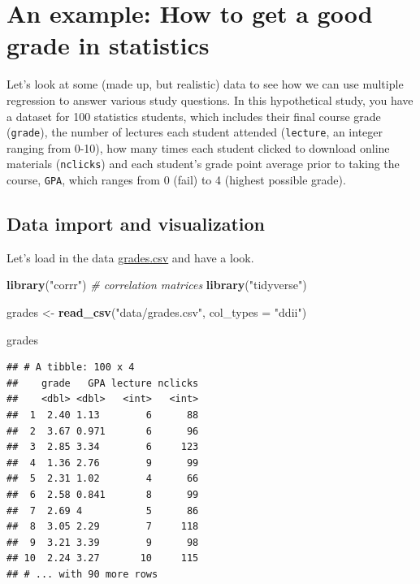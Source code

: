 \documentclass[]{book}
\newenvironment{Shaded}{\begin{snugshade}}{\end{snugshade}}
\newcommand{\CommentTok}[1]{\textcolor[rgb]{0.56,0.35,0.01}{\textit{#1}}}
\newcommand{\DataTypeTok}[1]{\textcolor[rgb]{0.13,0.29,0.53}{#1}}
\newcommand{\KeywordTok}[1]{\textcolor[rgb]{0.13,0.29,0.53}{\textbf{#1}}}
\newcommand{\NormalTok}[1]{#1}
\newcommand{\StringTok}[1]{\textcolor[rgb]{0.31,0.60,0.02}{#1}}
\begin{document}
\hypertarget{an-example-how-to-get-a-good-grade-in-statistics}{%
\section{An example: How to get a good grade in statistics}\label{an-example-how-to-get-a-good-grade-in-statistics}}

Let's look at some (made up, but realistic) data to see how we can use multiple regression to answer various study questions. In this hypothetical study, you have a dataset for 100 statistics students, which includes their final course grade (\texttt{grade}), the number of lectures each student attended (\texttt{lecture}, an integer ranging from 0-10), how many times each student clicked to download online materials (\texttt{nclicks}) and each student's grade point average prior to taking the course, \texttt{GPA}, which ranges from 0 (fail) to 4 (highest possible grade).

\hypertarget{data-import-and-visualization}{%
\subsection{Data import and visualization}\label{data-import-and-visualization}}

Let's load in the data \href{data/grades.csv}{grades.csv} and have a look.

\begin{Shaded}
\begin{Highlighting}[]
\KeywordTok{library}\NormalTok{(}\StringTok{"corrr"}\NormalTok{) }\CommentTok{# correlation matrices}
\KeywordTok{library}\NormalTok{(}\StringTok{"tidyverse"}\NormalTok{)}

\NormalTok{grades <-}\StringTok{ }\KeywordTok{read_csv}\NormalTok{(}\StringTok{"data/grades.csv"}\NormalTok{, }\DataTypeTok{col_types =} \StringTok{"ddii"}\NormalTok{)}

\NormalTok{grades}
\end{Highlighting}
\end{Shaded}

\begin{verbatim}
## # A tibble: 100 x 4
##    grade   GPA lecture nclicks
##    <dbl> <dbl>   <int>   <int>
##  1  2.40 1.13        6      88
##  2  3.67 0.971       6      96
##  3  2.85 3.34        6     123
##  4  1.36 2.76        9      99
##  5  2.31 1.02        4      66
##  6  2.58 0.841       8      99
##  7  2.69 4           5      86
##  8  3.05 2.29        7     118
##  9  3.21 3.39        9      98
## 10  2.24 3.27       10     115
## # ... with 90 more rows
\end{verbatim}
\end{document}
